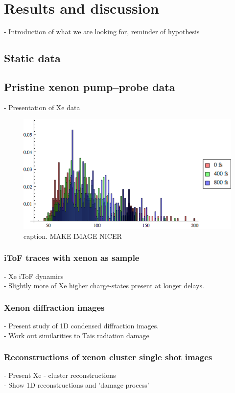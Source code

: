 \chapter{Results and discussion}\label{ch:results}
- Introduction of what we are looking for, reminder of hypothesis
\section{Static data}
\section{Pristine xenon pump--probe data}
- Presentation of Xe data
\begin{figure}
	\centering
		\includegraphics[width=1.00\textwidth]{images/size-distributions.png}
	\caption{caption. MAKE IMAGE NICER}
	\label{fig:size-distributions}
\end{figure}
%
\subsection{iToF traces with xenon as sample}
- Xe iToF dynamics\\
- Slightly more of Xe higher charge-states present at longer delays.
\subsection{Xenon diffraction images}
- Present study of 1D condensed diffraction images.\\
- Work out similarities to Tais radiation damage
\subsection{Reconstructions of xenon cluster single shot images}
- Present Xe - cluster reconstructions\\
- Show 1D reconstructions and 'damage process'
